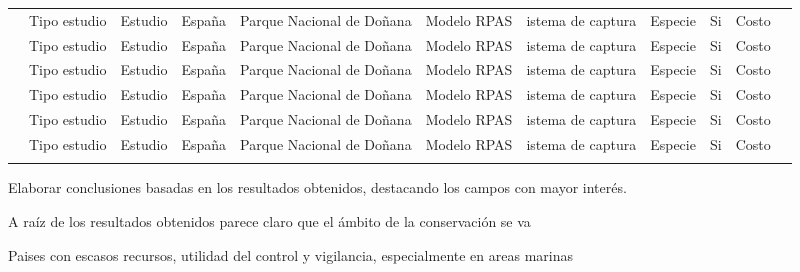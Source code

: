 \documentclass[11pt,]{article}
\begin{document}
\begin{sidewaystable}
\begin{tabular}{p{2.5cm}p{1cm}p{3cm}p{1cm}p{2cm}p{2cm}p{1cm}p{2cm}p{2cm}p{1cm}p{0.5cm}}
\cite{PazmanyMulero2015}  & Tipo estudio & Estudio & España & Parque Nacional de Doñana & Modelo RPAS  & istema de captura & Especie & Si & Costo  \\ 

\cite{PazmanyMulero2015}  & Tipo estudio & Estudio & España & Parque Nacional de Doñana & Modelo RPAS & istema de captura & Especie & Si & Costo  \\ 
\cite{PazmanyMulero2015}  & Tipo estudio & Estudio & España & Parque Nacional de Doñana & Modelo RPAS  & istema de captura & Especie & Si & Costo  \\ 
\cite{PazmanyMulero2015}  & Tipo estudio & Estudio & España & Parque Nacional de Doñana & Modelo RPAS & istema de captura & Especie & Si & Costo  \\ 
\cite{PazmanyMulero2015}  & Tipo estudio & Estudio & España & Parque Nacional de Doñana & Modelo RPAS  & istema de captura & Especie & Si & Costo  \\ 
\cite{PazmanyMulero2015}  & Tipo estudio & Estudio & España & Parque Nacional de Doñana & Modelo RPAS  & istema de captura & Especie & Si & Costo  \\ \\ \cmidrule(r){1-11}
\end{tabular}
\end{sidewaystable}

Elaborar conclusiones basadas en los resultados obtenidos, destacando
los campos con mayor interés.

A raíz de los resultados obtenidos parece claro que el ámbito de la
conservación se va

Paises con escasos recursos, utilidad del control y vigilancia,
especialmente en areas marinas

\newpage
\singlespacing 

\end{document}
